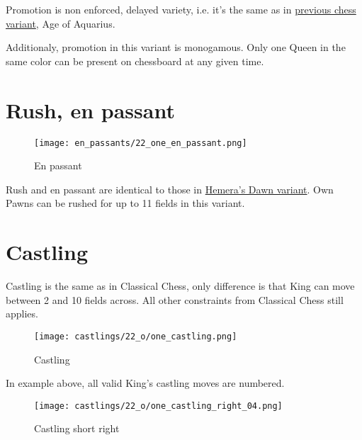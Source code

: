 Promotion is non enforced, delayed variety, i.e. it's the same as in
\hyperref[sec:Age of Aquarius/Promotion]{previous chess variant}, Age of Aquarius.

Additionaly, promotion in this variant is monogamous.
Only one Queen in the same color can be present on chessboard at any given time.

\clearpage %

\section*{Rush, en passant}

\vspace*{-1.2\baselineskip}
\noindent
\begin{figure}[!h]
\texttt{[image: en\_passants/22\_one\_en\_passant.png]}
\caption{En passant}
\label{fig:22_one_en_passant}
\end{figure}

Rush and en passant are identical to those in \hyperref[fig:14_hemera_s_dawn_en_passant]{Hemera's Dawn variant}.
Own Pawns can be rushed for up to 11 fields in this variant.

\clearpage %

\section*{Castling}

Castling is the same as in Classical Chess, only difference is that King can move between 2 and 10 fields across.
All other constraints from Classical Chess still applies.

\noindent
\begin{figure}[!h]
\texttt{[image: castlings/22\_o/one\_castling.png]}
\caption{Castling}
\label{fig:one_castling}
\end{figure}

In example above, all valid King's castling moves are numbered.

\noindent
\begin{figure}[!h]
\texttt{[image: castlings/22\_o/one\_castling\_right\_04.png]}
\caption{Castling short right}
\label{fig:one_castling_right_04}
\end{figure}

